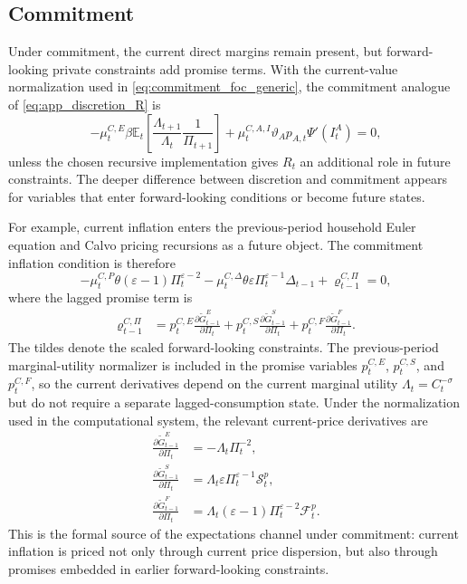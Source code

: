 ﻿\documentclass[12pt]{article}
\theoremstyle{remark}
\newcommand{\E}{\mathbb E}
\begin{document}
\subsection{Commitment}

Under commitment, the current direct margins remain present, but forward-looking private
constraints add promise terms. With the current-value normalization used in
\eqref{eq:commitment_foc_generic}, the commitment analogue of
\eqref{eq:app_discretion_R} is
\begin{equation}
    -\mu_t^{C,E}
    \beta
    \E_t
    \left[
        \frac{\Lambda_{t+1}}{\Lambda_t}
        \frac{1}{\Pi_{t+1}}
    \right]
    +
    \mu_t^{C,A,I}
    \vartheta_Ap_{A,t}\Psi'(I_t^A)
    =
    0,
    \label{eq:app_commitment_R}
\end{equation}
unless the chosen recursive implementation gives $R_t$ an additional role in future constraints.
The deeper difference between discretion and commitment appears for variables that enter
forward-looking conditions or become future states.

For example, current inflation enters the previous-period household Euler equation and Calvo
pricing recursions as a future object. The commitment inflation condition is therefore
\begin{equation}
    -\mu_t^{C,P}\theta(\varepsilon-1)\Pi_t^{\varepsilon-2}
    -
    \mu_t^{C,\Delta}\theta\varepsilon\Pi_t^{\varepsilon-1}\Delta_{t-1}
    +
    \varrho_{t-1}^{C,\Pi}
    =
    0,
    \label{eq:app_commitment_pi}
\end{equation}
where the lagged promise term is
\begin{align}
    \varrho_{t-1}^{C,\Pi}
    &=
    p_t^{C,E}
    \frac{\partial \widetilde G_{t-1}^{E}}{\partial \Pi_t}
    +
    p_t^{C,S}
    \frac{\partial \widetilde G_{t-1}^{S}}{\partial \Pi_t}
    +
    p_t^{C,F}
    \frac{\partial \widetilde G_{t-1}^{F}}{\partial \Pi_t}.
    \label{eq:app_pi_promise_term}
\end{align}
The tildes denote the scaled forward-looking constraints. The previous-period marginal-utility
normalizer is included in the promise variables $p_t^{C,E}$, $p_t^{C,S}$, and $p_t^{C,F}$, so the
current derivatives depend on the current marginal utility $\Lambda_t=C_t^{-\sigma}$ but do not
require a separate lagged-consumption state. Under the normalization used in the computational
system, the relevant current-price derivatives are
\begin{align}
    \frac{\partial \widetilde G_{t-1}^{E}}{\partial \Pi_t}
    &=
    -\Lambda_t\Pi_t^{-2},
    \label{eq:app_GE_pi_lag}\\
    \frac{\partial \widetilde G_{t-1}^{S}}{\partial \Pi_t}
    &=
    \Lambda_t\varepsilon\Pi_t^{\varepsilon-1}\mathcal S_t^p,
    \label{eq:app_GS_pi_lag}\\
    \frac{\partial \widetilde G_{t-1}^{F}}{\partial \Pi_t}
    &=
    \Lambda_t(\varepsilon-1)\Pi_t^{\varepsilon-2}\mathcal F_t^p.
    \label{eq:app_GF_pi_lag}
\end{align}
This is the formal source of the expectations channel under commitment: current inflation is priced
not only through current price dispersion, but also through promises embedded in earlier
forward-looking constraints.
\end{document}
